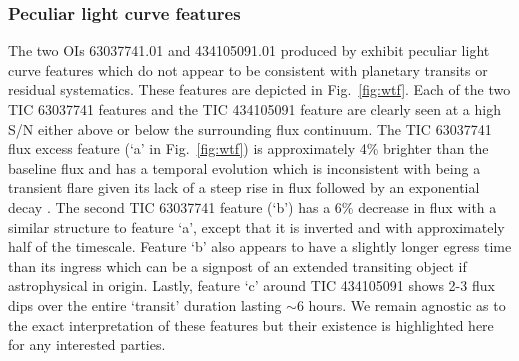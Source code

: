 \subsubsection{Peculiar light curve features}
The two OIs 63037741.01 and 434105091.01 produced by \pipeline{} exhibit peculiar
light curve features which do not appear to be consistent with planetary transits or residual systematics.
These features are depicted in Fig.~\ref{fig:wtf}. Each of the two TIC 63037741 features and the
TIC 434105091 feature are clearly seen at a high S/N either above or below the surrounding flux continuum.
The TIC 63037741 flux excess feature (`a' in Fig.~\ref{fig:wtf}) is approximately 4\% brighter than the baseline
flux and has a temporal evolution which is inconsistent with being a transient flare given its lack of a steep rise
in flux followed by an exponential decay \citep{hawley14}. The second TIC 63037741 feature (`b') has a 6\%
decrease in flux with a similar structure to feature `a', except that it is inverted and with approximately half
of the timescale. Feature `b' also appears to have
a slightly longer egress time than its ingress which can be a signpost of an extended transiting object if
astrophysical in origin.
Lastly, feature `c' around TIC 434105091 shows 2-3 flux dips over the entire `transit' duration lasting
$\sim 6$ hours. We remain agnostic as to the exact interpretation of these features but their existence is highlighted
here for any interested parties.

